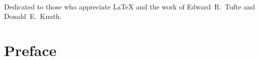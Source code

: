 \documentclass[12pt, a4paper, oneside, notitlepage]{book}
\begin{document}
\cleardoublepage
~\vfill
\begin{doublespace}
Dedicated to those who appreciate \LaTeX{} 
and the work of \mbox{Edward R.~Tufte} 
and \mbox{Donald E.~Knuth}.
\end{doublespace}
\vfill
\vfill

\tableofcontents

\listoffigures

\listoftables

\chapter*{Preface}
\lipsum[3]

\mainmatter
\end{document}
